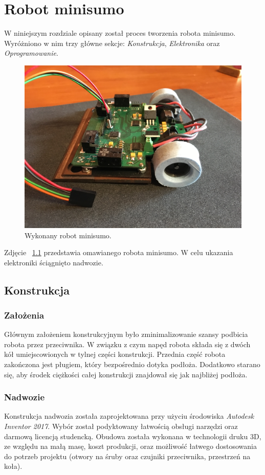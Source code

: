 \chapter{Robot minisumo}

W niniejszym rozdziale opisany został proces tworzenia robota minisumo. Wyróżniono w nim trzy główne sekcje: \textit{Konstrukcja}, \textit{Elektronika} oraz \textit{Oprogramowanie}.

\begin{figure}[H]
	\centering
		\includegraphics[width=0.75\linewidth]{pic04/minisumo.JPG}
	\caption{Wykonany robot minisumo.}
	\label{fig:robot}	
\end{figure}

Zdjęcie ~\ref{fig:robot} przedstawia omawianego robota minisumo. W celu ukazania elektroniki ściągnięto nadwozie.

\section{Konstrukcja}
\subsection{Założenia}
Głównym założeniem konstrukcyjnym było zminimalizowanie szansy podbicia robota przez przeciwnika. W związku z czym napęd robota składa się z dwóch kół umiejscowionych w tylnej części konstrukcji. Przednia część robota zakończona jest pługiem, który bezpośrednio dotyka podłoża. Dodatkowo starano się, aby środek ciężkości całej konstrukcji znajdował się jak najbliżej podłoża.

\subsection{Nadwozie}
Konstrukcja nadwozia została zaprojektowana przy użyciu środowiska \textit{Autodesk Inventor 2017}. Wybór został podyktowany łatwością obsługi narzędzi oraz darmową licencją studencką. Obudowa została wykonana w technologii druku 3D, ze względu na małą masę, koszt produkcji, oraz możliwość łatwego dostosowania do potrzeb projektu (otwory na śruby oraz czujniki przeciwnika, przestrzeń na koła).  

